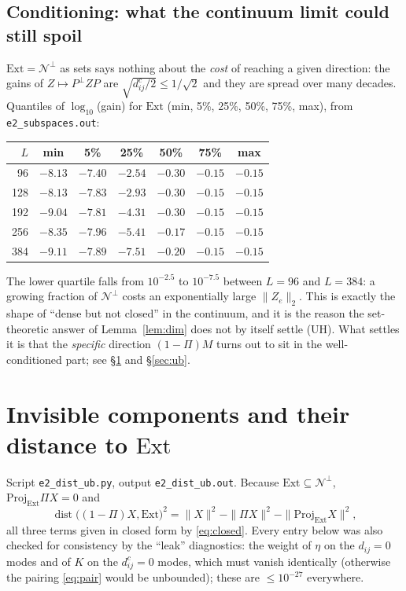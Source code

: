 \documentclass[11pt]{article}
\begin{document}
\subsection{Conditioning: what the continuum limit could still spoil}
$\mathrm{Ext}=\mathcal N^\perp$ as sets says nothing about the \emph{cost} of reaching a
given direction: the gains of $Z\mapsto P^\perp ZP$ are $\sqrt{d^c_{ij}/2}\le1/\sqrt2$ and
they are spread over many decades.  Quantiles of $\log_{10}$(gain) for $\mathrm{Ext}$
(min, 5\%, 25\%, 50\%, 75\%, max), from \texttt{e2\_subspaces.out}:
\begin{center}\small
\begin{tabular}{rcccccc}
\toprule
$L$&min&5\%&25\%&50\%&75\%&max\\\midrule
96 &$-8.13$&$-7.40$&$-2.54$&$-0.30$&$-0.15$&$-0.15$\\
128&$-8.13$&$-7.83$&$-2.93$&$-0.30$&$-0.15$&$-0.15$\\
192&$-9.04$&$-7.81$&$-4.31$&$-0.30$&$-0.15$&$-0.15$\\
256&$-8.35$&$-7.96$&$-5.41$&$-0.17$&$-0.15$&$-0.15$\\
384&$-9.11$&$-7.89$&$-7.51$&$-0.20$&$-0.15$&$-0.15$\\
\bottomrule
\end{tabular}
\end{center}
The lower quartile falls from $10^{-2.5}$ to $10^{-7.5}$ between $L=96$ and $L=384$: a
growing fraction of $\mathcal N^\perp$ costs an exponentially large $\|Z_e\|_2$.  This is
exactly the shape of ``dense but not closed'' in the continuum, and it is the reason the
set-theoretic answer of Lemma~\ref{lem:dim} does not by itself settle (UH).  What settles
it is that the \emph{specific} direction $(1-\Pi)M$ turns out to sit in the well-conditioned
part; see \S\ref{sec:dist} and \S\ref{sec:ub}.


\section{Invisible components and their distance to $\mathrm{Ext}$}\label{sec:dist}

Script \texttt{e2\_dist\_ub.py}, output \texttt{e2\_dist\_ub.out}.  Because
$\mathrm{Ext}\subseteq\mathcal N^\perp$, $\mathrm{Proj}_{\mathrm{Ext}}\Pi X=0$ and
\begin{equation}\label{eq:d2}
 \operatorname{dist}\bigl((1-\Pi)X,\mathrm{Ext}\bigr)^2
 =\|X\|^2-\|\Pi X\|^2-\|\mathrm{Proj}_{\mathrm{Ext}}X\|^2 ,
\end{equation}
all three terms given in closed form by \eqref{eq:closed}.  Every entry below was also
checked for consistency by the ``leak'' diagnostics: the weight of $\eta$ on the
$d_{ij}=0$ modes and of $K$ on the $d^c_{ij}=0$ modes, which must vanish identically
(otherwise the pairing \eqref{eq:pair} would be unbounded); these are $\le10^{-27}$
everywhere.
\end{document}
